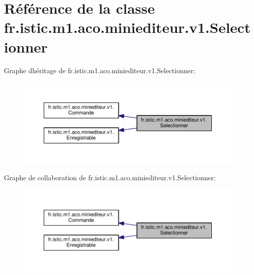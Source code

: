 \hypertarget{classfr_1_1istic_1_1m1_1_1aco_1_1miniediteur_1_1v1_1_1Selectionner}{}\section{Référence de la classe fr.\+istic.\+m1.\+aco.\+miniediteur.\+v1.\+Selectionner}
\label{classfr_1_1istic_1_1m1_1_1aco_1_1miniediteur_1_1v1_1_1Selectionner}


Graphe d\textquotesingle{}héritage de fr.\+istic.\+m1.\+aco.\+miniediteur.\+v1.\+Selectionner\+:
\nopagebreak
\begin{figure}[H]
\begin{center}
\leavevmode
\includegraphics[width=350pt]{classfr_1_1istic_1_1m1_1_1aco_1_1miniediteur_1_1v1_1_1Selectionner__inherit__graph}
\end{center}
\end{figure}


Graphe de collaboration de fr.\+istic.\+m1.\+aco.\+miniediteur.\+v1.\+Selectionner\+:
\nopagebreak
\begin{figure}[H]
\begin{center}
\leavevmode
\includegraphics[width=350pt]{classfr_1_1istic_1_1m1_1_1aco_1_1miniediteur_1_1v1_1_1Selectionner__coll__graph}
\end{center}
\end{figure}
